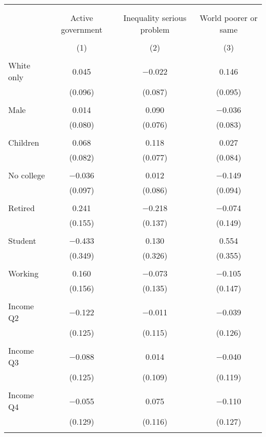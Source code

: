 
\begin{tabular}{@{\extracolsep{5pt}}lccc} 
\\[-1.8ex]\hline 
\hline \\[-1.8ex] 
\\[-1.8ex] & Active government & Inequality serious problem & World poorer or same \\ 
\\[-1.8ex] & (1) & (2) & (3)\\ 
\hline \\[-1.8ex] 
 White only & 0.045 & $-$0.022 & 0.146 \\ 
  & (0.096) & (0.087) & (0.095) \\ 
  & & & \\ 
 Male & 0.014 & 0.090 & $-$0.036 \\ 
  & (0.080) & (0.076) & (0.083) \\ 
  & & & \\ 
 Children & 0.068 & 0.118 & 0.027 \\ 
  & (0.082) & (0.077) & (0.084) \\ 
  & & & \\ 
 No college & $-$0.036 & 0.012 & $-$0.149 \\ 
  & (0.097) & (0.086) & (0.094) \\ 
  & & & \\ 
 Retired & 0.241 & $-$0.218 & $-$0.074 \\ 
  & (0.155) & (0.137) & (0.149) \\ 
  & & & \\ 
 Student & $-$0.433 & 0.130 & 0.554 \\ 
  & (0.349) & (0.326) & (0.355) \\ 
  & & & \\ 
 Working & 0.160 & $-$0.073 & $-$0.105 \\ 
  & (0.156) & (0.135) & (0.147) \\ 
  & & & \\ 
 Income Q2 & $-$0.122 & $-$0.011 & $-$0.039 \\ 
  & (0.125) & (0.115) & (0.126) \\ 
  & & & \\ 
 Income Q3 & $-$0.088 & 0.014 & $-$0.040 \\ 
  & (0.125) & (0.109) & (0.119) \\ 
  & & & \\ 
 Income Q4 & $-$0.055 & 0.075 & $-$0.110 \\ 
  & (0.129) & (0.116) & (0.127) \\ 
  & & & \\ 

\end{tabular}
